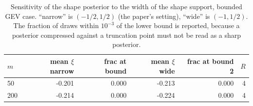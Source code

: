 \begin{table}[t]
\centering
\small
\caption{Sensitivity of the shape posterior to the width of the shape support, bounded GEV case. ``narrow'' is $(-1/2,1/2)$ (the paper's setting), ``wide'' is $(-1,1/2)$. The fraction of draws within $10^{-3}$ of the lower bound is reported, because a posterior compressed against a truncation point must not be read as a sharp posterior.}
\label{tab:sim-misspec}
\begin{tabular}{lrrrrr}
\toprule
$m$ & mean $\xi$ narrow & frac at bound & mean $\xi$ wide & frac at bound 2 & $R$ \\
\midrule
  50 & -0.201 & 0.000 & -0.213 & 0.000 &    4 \\
 200 & -0.214 & 0.000 & -0.224 & 0.000 &    4 \\
\bottomrule
\end{tabular}
\end{table}
